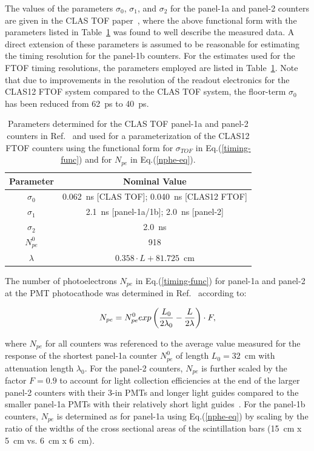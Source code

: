 \documentclass{elsart}
\begin{document}
The values of the parameters $\sigma_0$, $\sigma_1$, and $\sigma_2$ for the panel-1a and panel-2 counters
are given in the CLAS TOF paper~\cite{tof-nim}, where the above functional form with the parameters listed
in Table~\ref{timing-parms} was found to well describe the measured data. A direct extension of these
parameters is assumed to be reasonable for estimating the timing resolution for the panel-1b counters. For the
estimates used for the FTOF timing resolutions, the parameters employed are listed in Table~\ref{timing-parms}.
Note that due to improvements in the resolution of the readout electronics for the CLAS12 FTOF system compared
to the CLAS TOF system, the floor-term $\sigma_0$ has been reduced from 62~ps to 40~ps. 

\begin{table}[htbp]
\begin{center}
\begin{tabular} {c|c} \hline
Parameter    & Nominal Value\\ \hline
$\sigma_0$ & 0.062~ns [CLAS TOF]; 0.040~ns [CLAS12 FTOF] \\ \hline
$\sigma_1$  & 2.1~ns [panel-1a/1b]; 2.0~ns [panel-2] \\ \hline
$\sigma_2$  & 2.0~ns \\ \hline
$N_{pe}^0$   & 918 \\ \hline
$\lambda$   & $0.358\cdot L + 81.725$~cm \\ \hline
\end{tabular}
\caption{Parameters determined for the CLAS TOF panel-1a and panel-2 counters in Ref.~\cite{tof-nim}
and used for a parameterization of the CLAS12 FTOF counters using the functional form for $\sigma_{TOF}$
in Eq.(\ref{timing-func}) and for $N_{pe}$ in Eq.(\ref{nphe-eq}).}
\label{timing-parms}
\end{center}
\end{table}

The number of photoelectrons $N_{pe}$ in Eq.(\ref{timing-func}) for panel-1a and panel-2 at the PMT
photocathode was determined in Ref.~\cite{tof-nim} according to:

\begin{equation}
\label{nphe-eq}
N_{pe} = N_{pe}^0 {\rm exp} \left( \frac{L_0}{2 \lambda_0} - \frac{L}{2 \lambda} \right) \cdot F,
\end{equation}

\noindent
where $N_{pe}$ for all counters was referenced to the average value measured for the response of the
shortest panel-1a counter $N_{pe}^0$ of length $L_0=32$~cm with attenuation length $\lambda_0$. For the
panel-2 counters, $N_{pe}$ is further scaled by the factor $F = 0.9$ to account for light collection
efficiencies at the end of the larger panel-2 counters with their 3-in PMTs and longer light guides compared
to the smaller panel-1a PMTs with their relatively short light guides~\cite{tof-nim}. For the panel-1b counters,
$N_{pe}$ is determined as for panel-1a using Eq.(\ref{nphe-eq}) by scaling by the ratio of the widths of the
cross sectional areas of the scintillation bars (15~cm x 5~cm vs. 6~cm x 6~cm). 
\end{document}
